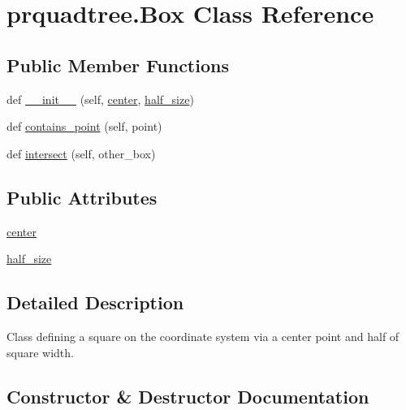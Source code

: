\hypertarget{classprquadtree_1_1Box}{}\section{prquadtree.\+Box Class Reference}
\label{classprquadtree_1_1Box}
\subsection*{Public Member Functions}
\begin{DoxyCompactItemize}
\item 
def \hyperlink{classprquadtree_1_1Box_a0ff4532e81c55a7b41c35e85b0099168}{\+\_\+\+\_\+init\+\_\+\+\_\+} (self, \hyperlink{classprquadtree_1_1Box_a97475b97164cac388fc673e08ce2707e}{center}, \hyperlink{classprquadtree_1_1Box_ac40b9c6e566a2ca829a2e84e3f741294}{half\+\_\+size})
\item 
def \hyperlink{classprquadtree_1_1Box_a3f8878c3fa9a89b786103d31821304df}{contains\+\_\+point} (self, point)
\item 
def \hyperlink{classprquadtree_1_1Box_af8b0a29f1094809b6ae0793077d51648}{intersect} (self, other\+\_\+box)
\end{DoxyCompactItemize}
\subsection*{Public Attributes}
\begin{DoxyCompactItemize}
\item 
\hyperlink{classprquadtree_1_1Box_a97475b97164cac388fc673e08ce2707e}{center}
\item 
\hyperlink{classprquadtree_1_1Box_ac40b9c6e566a2ca829a2e84e3f741294}{half\+\_\+size}
\end{DoxyCompactItemize}


\subsection{Detailed Description}
\begin{DoxyVerb}Class defining a square on the coordinate system via a center point and
half of square width.
\end{DoxyVerb}
 

\subsection{Constructor \& Destructor Documentation}
\hypertarget{classprquadtree_1_1Box_a0ff4532e81c55a7b41c35e85b0099168}{}
